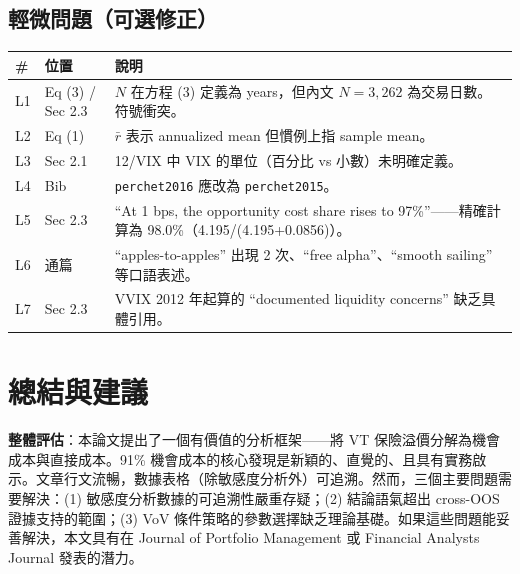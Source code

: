 \documentclass[12pt,a4paper]{article}
\begin{document}
\subsection*{輕微問題（可選修正）}

\begin{longtable}{p{0.5cm}p{2.5cm}p{10.5cm}}
\toprule
\# & 位置 & 說明 \\
\midrule
L1 & Eq (3) / Sec 2.3 & $N$ 在方程 (3) 定義為 years，但內文 $N = 3{,}262$ 為交易日數。符號衝突。 \\
\midrule
L2 & Eq (1) & $\bar{r}$ 表示 annualized mean 但慣例上指 sample mean。 \\
\midrule
L3 & Sec 2.1 & 12/VIX 中 VIX 的單位（百分比 vs 小數）未明確定義。 \\
\midrule
L4 & Bib & \texttt{perchet2016} 應改為 \texttt{perchet2015}。 \\
\midrule
L5 & Sec 2.3 & ``At 1 bps, the opportunity cost share rises to 97\%''——精確計算為 98.0\%（4.195/(4.195+0.0856)）。 \\
\midrule
L6 & 通篇 & ``apples-to-apples'' 出現 2 次、``free alpha''、``smooth sailing'' 等口語表述。 \\
\midrule
L7 & Sec 2.3 & VVIX 2012 年起算的 ``documented liquidity concerns'' 缺乏具體引用。 \\
\bottomrule
\end{longtable}

\section*{總結與建議}

\textbf{整體評估}：本論文提出了一個有價值的分析框架——將 VT 保險溢價分解為機會成本與直接成本。91\% 機會成本的核心發現是新穎的、直覺的、且具有實務啟示。文章行文流暢，數據表格（除敏感度分析外）可追溯。然而，三個主要問題需要解決：(1) 敏感度分析數據的可追溯性嚴重存疑；(2) 結論語氣超出 cross-OOS 證據支持的範圍；(3) VoV 條件策略的參數選擇缺乏理論基礎。如果這些問題能妥善解決，本文具有在 Journal of Portfolio Management 或 Financial Analysts Journal 發表的潛力。

\bigskip
\end{document}
